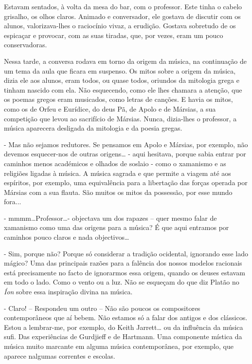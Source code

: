 Estavam sentados, à volta da mesa do bar, com o professor. Este tinha o
cabelo grisalho, os olhos claros. Animado e conversador, ele gostava de
discutir com os alunos, valorizava-lhes o raciocínio vivaz, a erudição.
Gostava sobretudo de os espicaçar e provocar, com as suas tiradas, que,
por vezes, eram um pouco conservadoras.

Nessa tarde, a conversa rodava em torno da origem da música, na
continuação de um tema da aula que ficara em suspenso. Os mitos sobre a
origem da música, dizia ele aos alunos, eram todos, ou quase todos,
oriundos da mitologia grega e tinham nascido com ela. Não esquecendo,
como ele lhes chamara a atenção, que os poemas gregos eram musicados,
como letras de canções. E havia os mitos, como os de Orfeu e Eurídice,
do deus Pã, de Apolo e de Mársias, a sua competição que levou ao
sacrifício de Mársias. Nunca, dizia-lhes o professor, a música aparecera
desligada da mitologia e da poesia gregas.

- Mas não sejamos redutores. Se pensamos em Apolo e Mársias, por
exemplo, não devemos esquecer-nos de outras origens\ldots{} - aqui
hesitava, porque sabia entrar por caminhos menos académicos e olhados de
soslaio - como o xamanismo e as religiões ligadas à música. A música
sagrada e que permite a viagem até aos espíritos, por exemplo, uma
equivalência para a libertação das forças operada por Mársias com a sua
flauta. São muitos os mitos da possessão, por esse mundo fora...

- mmmm\ldots{}Professor\ldots{}- objectava um dos rapazes -- quer mesmo
falar de xamanismo como uma das origens para a música? É que aqui
entramos por caminhos pouco claros e nada objectivos\ldots{}

- Sim, porque não? Porque só considerar a tradição ocidental, ignorando
esse lado mágico? Uma das principais razões para a falência dos nossos
modelos racionais está precisamente no facto de ignorarmos essa origem,
quando os deuses estavam em todo o lado. Como o vento ou a luz. Não se
esqueçam do que diz Platão no \emph{Íon }sobre essa inspiração divina na
música.

- Claro! -- Respondeu um outro -- Não são poucos os compositores
contemporâneos que aí bebem. Não estamos só a falar dos antigos e dos
clássicos. Estou a lembrar-me, por exemplo, do Keith Jarrett\ldots{} ou
da influência da música sufi. Das experiências de Gurdjieff e de
Hartmann. Uma componente mística da música muito marcante em alguma
música contemporânea, por exemplo, que aparece nalgumas correntes e
escolas.

